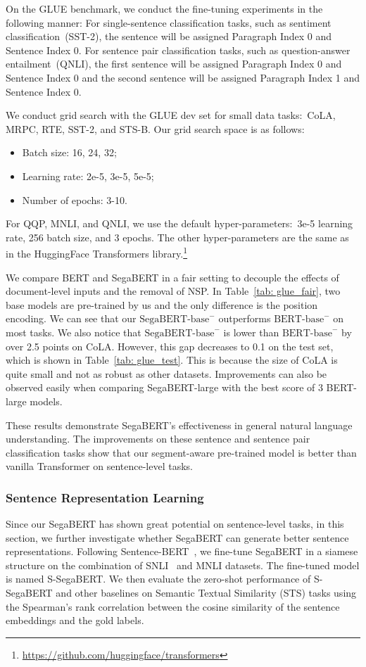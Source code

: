 \documentclass[letterpaper]{article}
\begin{document}
On the GLUE benchmark, we conduct the fine-tuning experiments in the following manner: For single-sentence classification tasks, such as sentiment classification~(SST-2), the sentence will be assigned Paragraph Index 0 and Sentence Index 0.
For sentence pair classification tasks, such as question-answer entailment~(QNLI), the first sentence will be assigned Paragraph Index 0 and Sentence Index 0 and the second sentence will be assigned Paragraph Index 1 and Sentence Index 0. 

We conduct grid search with the GLUE dev set for small data tasks:\ CoLA, MRPC, RTE, SST-2, and STS-B. 
Our grid search space is as follows: 

\begin{itemize}
    \item Batch size: 16, 24, 32;  
    \item Learning rate: 2e-5, 3e-5, 5e-5; 
    \item Number of epochs: 3-10.
\end{itemize}

For QQP, MNLI, and QNLI, we use the default hyper-parameters:\ 3e-5 learning rate, 256 batch size, and 3 epochs. 
The other hyper-parameters are the same as in the HuggingFace Transformers library.\footnote{\url{https://github.com/huggingface/transformers}} 

We compare BERT and SegaBERT in a fair setting to decouple the effects of document-level inputs and the removal of NSP.
In Table~\ref{tab: glue_fair}, two base models are pre-trained by us and the only difference is the position encoding.
We can see that our $\text{SegaBERT-base}^{-}$ outperforms $\text{BERT-base}^{-}$ on most tasks. 
We also notice that $\text{SegaBERT-base}^{-}$ is lower than $\text{BERT-base}^{-}$ by over 2.5 points on CoLA. 
However, this gap decreases to 0.1 on the test set, which is shown in Table~\ref{tab: glue_test}.
This is because the size of CoLA is quite small and not as robust as other datasets.
Improvements can also be observed easily when comparing SegaBERT-large with the best score of 3 BERT-large models. 

These results demonstrate SegaBERT's effectiveness in general natural language understanding. 
The improvements on these sentence and sentence pair classification tasks show that our segment-aware pre-trained model is better than vanilla Transformer on sentence-level tasks.

\subsubsection{Sentence Representation Learning}
Since our SegaBERT has shown great potential on sentence-level tasks, in this section, we further investigate whether SegaBERT can generate better sentence representations.
Following Sentence-BERT~\citep{DBLP:conf/emnlp/sbert}, we fine-tune SegaBERT in a siamese structure on the combination of SNLI~\cite{DBLP:conf/emnlp/BowmanAPM15} and MNLI datasets. The fine-tuned model is named S-SegaBERT.
We then evaluate the zero-shot performance of S-SegaBERT and other baselines on Semantic Textual Similarity (STS) tasks using the Spearman's rank correlation between the cosine similarity of the sentence embeddings and the gold labels. 
\end{document}
